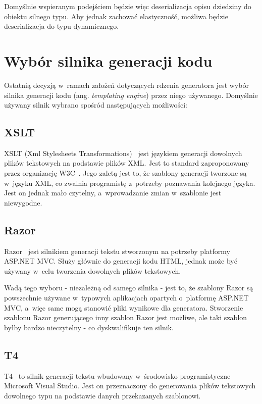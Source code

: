 Domyślnie wspieranym podejściem będzie więc deserializacja opisu dziedziny do obiektu silnego typu.
Aby jednak zachować elastyczność, możliwa będzie deserializacja do typu dynamicznego.



\section{Wybór silnika generacji kodu} \label{sec:core:templating_engine}

Ostatnią decyzją w~ramach założeń dotyczących rdzenia generatora jest wybór silnika generacji kodu (ang. \emph{templating engine}) przez niego używanego.
Domyślnie używany silnik wybrano spośród następujących możliwości:


\subsection{XSLT}

XSLT (Xml Stylesheets Transformations)~\cite{xslt} jest językiem generacji dowolnych plików tekstowych na podstawie plików XML.
Jest to standard zaproponowany przez organizację W3C~\cite{w3c}.
Jego zaletą jest to, że szablony generacji tworzone są w~języku XML, co zwalnia programistę z~potrzeby poznawania kolejnego języka.
Jest on jednak mało czytelny, a~wprowadzanie zmian w~szablonie jest niewygodne.


\subsection{Razor}

Razor~\cite{razor} jest silnikiem generacji tekstu stworzonym na potrzeby platformy ASP.NET MVC.
Służy głównie do generacji kodu HTML, jednak może być używany w~celu tworzenia dowolnych plików tekstowych.

Wadą tego wyboru - niezależną od samego silnika - jest to, że szablony Razor są powszechnie używane w~typowych aplikacjach opartych o~platformę ASP.NET MVC, a~więc same mogą stanowić pliki wynikowe dla generatora.
Stworzenie szablonu Razor generującego inny szablon Razor jest możliwe, ale taki szablon byłby bardzo nieczytelny - co dyskwalifikuje ten silnik.


\subsection{T4}

T4~\cite{t4} to silnik generacji tekstu wbudowany w~środowisko programistyczne Microsoft Visual Studio.
Jest on przeznaczony do generowania plików tekstowych dowolnego typu na podstawie danych przekazanych szablonowi.

